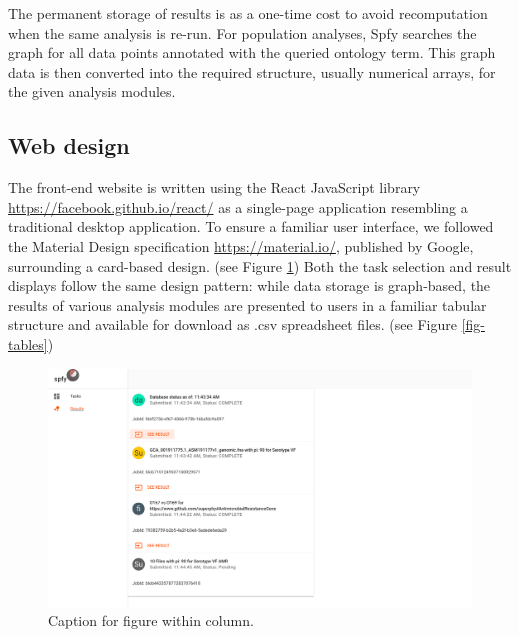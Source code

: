 \documentclass{article}
\begin{document}
The permanent storage of results is as a one-time cost to avoid recomputation when the same analysis is re-run. For population analyses, Spfy searches the graph for all data points annotated with the queried ontology term. This graph data is then converted into the required structure, usually numerical arrays, for the given analysis modules.


\subsection{Web design}

The front-end website is written using the React JavaScript library \url{https://facebook.github.io/react/} as a single-page application resembling a traditional desktop application.
To ensure a familiar user interface, we followed the Material Design specification \url{https://material.io/}, published by Google, surrounding a card-based design.
(see Figure \ref{fig-results})
Both the task selection and result displays follow the same design pattern: while data storage is graph-based, the results of various analysis modules are presented to users in a familiar tabular structure and available for download as .csv spreadsheet files.
(see Figure \ref{fig-tables})

\begin{figure}[!hb]
\begin{center}
\includegraphics[width=\textwidth]{images/results.png}
\end{center}
\caption{Caption for figure within column.}
\label{fig-results}
\end{figure}
\end{document}
